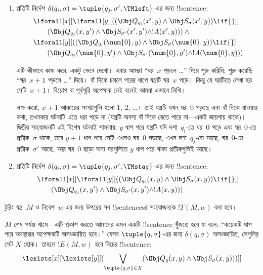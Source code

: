 \documentclass[../../../include/open-logic-section]{subfiles}
\begin{document}
\begin{enumerate}
\begin{enumerate}
\item {} প্রতিটি নির্দেশ
$\delta(q_i,\sigma)=\tuple{q_j,\sigma',\TMleft}$-এর জন্য !!{sentence}:
\begin{align*}
& \lforall[x][\lforall[y][
    ((\Obj Q_{q_i}(x', y) \land \Obj S_{\sigma}(x', y)) \lif {}]]\\
& \qquad   (\Obj Q_{q_j}(x, y') \land \Obj S_{\sigma'}(x', y') \land
!A(x', y))) \land {}\\
& \lforall[y][((\Obj Q_{q_i}(\num{0}, y) \land \Obj S_{\sigma}(\num{0},
    y)) \lif {}]\\
& \qquad (\Obj Q_{q_j}(\num{0}, y') \land \Obj S_{\sigma'}(\num{0},
  y') \land !A(\num{0}, y)))
\end{align*}

এটি কীভাবে কাজ করে, একটু ভেবে দেখো। এবার আমরা “ঘর~$x$ পড়লে \dots” দিয়ে
শুরু করিনি; শুরু করেছি “ঘর~$x+1$ পড়লে \dots” দিয়ে। বাঁ দিকে চললে পরের
ধাপে যন্ত্রটি ঘর~$x$ পড়ে। কিন্তু যে ঘরটিতে লেখা হয় সেটি~$x+1$। বিয়োগ বা
পূর্বসূরি অপেক্ষক নেই বলেই আমরা এভাবে লিখি।

লক্ষ করো, $x+1$ আকারের সংখ্যাগুলি হলো $1$, $2$, \dots। তাই যন্ত্রটি যখন
ঘর~$0$ পড়ছে এবং বাঁ দিকে যাওয়ার কথা, তখনকার ঘটনাটি এতে ধরা পড়ে না
(যন্ত্রটি অবশ্য বাঁ দিকে যেতে পারে না—একই জায়গায় থাকে)। দ্বিতীয় সংযোজনটি
এই বিশেষ ঘটনাই সামলায়: $y$ ধাপ পরে যন্ত্রটি যদি দশা~$q_i$-তে ঘর~$0$ পড়ে
এবং ঘর~$0$-তে প্রতীক~$\sigma$ থাকে, তবে $y+1$ ধাপ পরে সেটি এখনও ঘর~$0$
পড়ছে, এখন দশা~$q_j$-তে আছে, ঘর~$0$-তে প্রতীক~$\sigma'$ আছে, আর ঘর~$0$
ছাড়া অন্য ঘরগুলিতে $y$ ধাপ পরে থাকা প্রতীকগুলিই আছে।
\item {} প্রতিটি নির্দেশ
$\delta(q_i,\sigma)=\tuple{q_j,\sigma',\TMstay}$-এর জন্য !!{sentence}:
\begin{align*}
& \lforall[x][\lforall[y][(
   (\Obj Q_{q_i}(x, y) \land \Obj S_{\sigma}(x, y)) \lif {}]] \\
&\qquad   (\Obj Q_{q_j}(x, y') \land \Obj S_{\sigma'}(x, y') \land
!A(x, y)))
\end{align*}
\end{enumerate}
\end{enumerate}
টুরিং যন্ত্র~$M$ ও নিবেশ~$w$-এর জন্য উপরের সব !!{sentence}sর সংযোজনকে
$!T(M,w)$ বলা হবে।

$M$ শেষ পর্যন্ত থামে—এটি প্রকাশ করতে আমাদের এমন একটি !!{sentence} খুঁজতে হবে
যা বলে: “কয়েকটি ধাপ পরে অবস্থান্তর অপেক্ষকটি অসংজ্ঞায়িত হবে।” যেসব
$\tuple{q,\sigma}$-এর জন্য $\delta(q,\sigma)$ অসংজ্ঞায়িত, সেগুলির সেট
$X$ হোক। তাহলে $!E(M,w)$ হবে নিচের !!{sentence}:
\[
\lexists[x][\lexists[y][(\bigvee_{\tuple{q, \sigma} \in
      X}(\Obj Q_q(x, y) \land \Obj S_\sigma(x, y)))]]
\]
\end{document}
